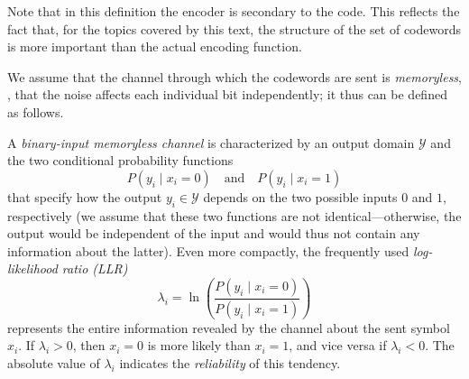 Note that in this definition the encoder is secondary to the code. This reflects the fact that, for the topics covered by this text, the structure of the set of codewords is more important than the actual encoding function.

We assume that the channel through which the codewords are sent is \emph{memoryless}, \ie, that the noise affects each individual bit independently; it thus can be defined as follows.
\begin{definition}
  \label{def:intro-channel}
   A \emph{binary-input memoryless channel} is characterized by an output domain $\mathcal Y$ and the two conditional probability functions
  \begin{equation}
    P(y_i∣x_i=0) \quad\text{and}\quad P(y_i∣x_i=1)
    \label{eq:intro-channelmodel}
  \end{equation}
  that specify how the output $y_i ∈ \mathcal Y$ depends on the two possible inputs $0$ and $1$, respectively (we assume that these two functions are not identical—otherwise, the output would be independent of the input and would thus not contain any information about the latter). Even more compactly, the frequently used \emph{log-likelihood ratio (LLR)}
  \begin{equation}
   λ_i = \ln\left(\frac{P(y_i∣x_i=0)}{P(y_i∣x_i=1)}\right)
   \label{eq:intro-llr}
  \end{equation}
represents%
the entire information revealed by the channel about the sent symbol $x_i$. If $λ_i>0$, then $x_i=0$ is more likely than $x_i=1$, and vice versa if $λ_i<0$. The absolute value of $λ_i$ indicates the \emph{reliability} of this tendency.
\end{definition}

